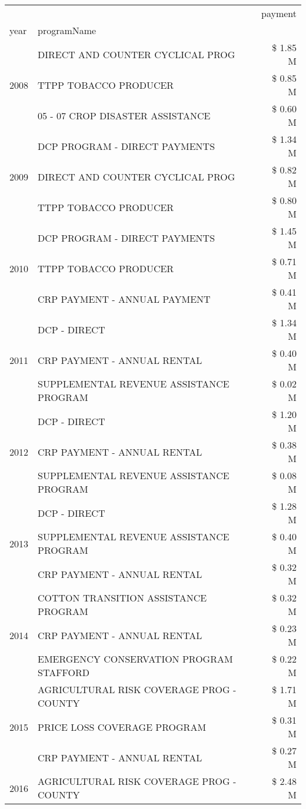 \begin{tabular}{llr}
\toprule
 &  & payment \\
year & programName &  \\
\midrule
\multirow[t]{3}{*}{2008} & DIRECT AND COUNTER CYCLICAL PROG & \$ 1.85 M \\
 & TTPP TOBACCO PRODUCER & \$ 0.85 M \\
 & 05 - 07 CROP DISASTER ASSISTANCE & \$ 0.60 M \\
\cline{1-3}
\multirow[t]{3}{*}{2009} & DCP PROGRAM - DIRECT PAYMENTS & \$ 1.34 M \\
 & DIRECT AND COUNTER CYCLICAL PROG & \$ 0.82 M \\
 & TTPP TOBACCO PRODUCER & \$ 0.80 M \\
\cline{1-3}
\multirow[t]{3}{*}{2010} & DCP PROGRAM - DIRECT PAYMENTS & \$ 1.45 M \\
 & TTPP TOBACCO PRODUCER & \$ 0.71 M \\
 & CRP PAYMENT - ANNUAL PAYMENT & \$ 0.41 M \\
\cline{1-3}
\multirow[t]{3}{*}{2011} & DCP - DIRECT & \$ 1.34 M \\
 & CRP PAYMENT - ANNUAL RENTAL & \$ 0.40 M \\
 & SUPPLEMENTAL REVENUE ASSISTANCE PROGRAM & \$ 0.02 M \\
\cline{1-3}
\multirow[t]{3}{*}{2012} & DCP - DIRECT & \$ 1.20 M \\
 & CRP PAYMENT - ANNUAL RENTAL & \$ 0.38 M \\
 & SUPPLEMENTAL REVENUE ASSISTANCE PROGRAM & \$ 0.08 M \\
\cline{1-3}
\multirow[t]{3}{*}{2013} & DCP - DIRECT & \$ 1.28 M \\
 & SUPPLEMENTAL REVENUE ASSISTANCE PROGRAM & \$ 0.40 M \\
 & CRP PAYMENT - ANNUAL RENTAL & \$ 0.32 M \\
\cline{1-3}
\multirow[t]{3}{*}{2014} & COTTON TRANSITION ASSISTANCE PROGRAM & \$ 0.32 M \\
 & CRP PAYMENT - ANNUAL RENTAL & \$ 0.23 M \\
 & EMERGENCY CONSERVATION PROGRAM STAFFORD & \$ 0.22 M \\
\cline{1-3}
\multirow[t]{3}{*}{2015} & AGRICULTURAL RISK COVERAGE PROG - COUNTY & \$ 1.71 M \\
 & PRICE LOSS COVERAGE PROGRAM & \$ 0.31 M \\
 & CRP PAYMENT - ANNUAL RENTAL & \$ 0.27 M \\
\cline{1-3}
\multirow[t]{3}{*}{2016} & AGRICULTURAL RISK COVERAGE PROG - COUNTY & \$ 2.48 M \\

\end{tabular}
